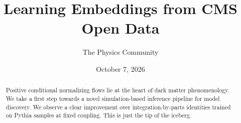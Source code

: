 \documentclass[11pt]{article}
\title{Learning Embeddings from CMS Open Data}
\author{The Physics Community}
\date{October 7, 2026}
\numberwithin{equation}{section}
\theoremstyle{definition}
\theoremstyle{remark}
\begin{document}
\maketitle
\begin{abstract}
Positive conditional normalizing flows lie at the heart of dark matter
phenomenology. We take a first step towards a novel simulation-based
inference pipeline for model discovery. We observe a clear improvement
over integration-by-parts identities trained on Pythia samples at fixed
coupling. This is just the tip of the iceberg.
\end{abstract}
\tableofcontents





\nocite{*}


\end{document}
